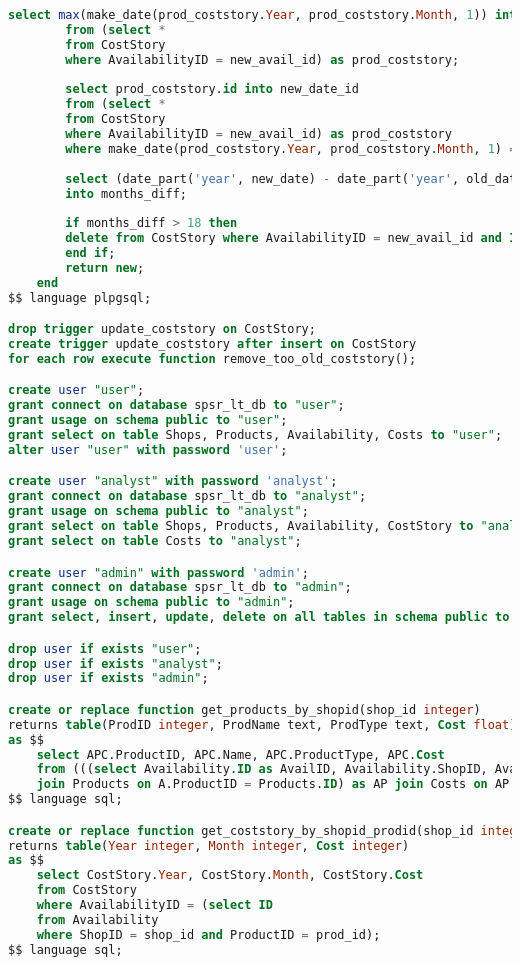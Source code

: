 \documentclass{bmstu}
\begin{document}
\begin{lstlisting}[language=sql, caption={Сценарий создания БД}]
		select max(make_date(prod_coststory.Year, prod_coststory.Month, 1)) into new_date
		from (select * 
		from CostStory 
		where AvailabilityID = new_avail_id) as prod_coststory;
		
		select prod_coststory.id into new_date_id
		from (select * 
		from CostStory 
		where AvailabilityID = new_avail_id) as prod_coststory
		where make_date(prod_coststory.Year, prod_coststory.Month, 1) = new_date;
		
		select (date_part('year', new_date) - date_part('year', old_date)) * 12 + (date_part('month', new_date) - date_part('month', old_date)) + 1
		into months_diff;
		
		if months_diff > 18 then
		delete from CostStory where AvailabilityID = new_avail_id and ID = old_date_id;
		end if;
		return new;
	end
$$ language plpgsql;

drop trigger update_coststory on CostStory;
create trigger update_coststory after insert on CostStory
for each row execute function remove_too_old_coststory();

create user "user";
grant connect on database spsr_lt_db to "user";
grant usage on schema public to "user";
grant select on table Shops, Products, Availability, Costs to "user";
alter user "user" with password 'user';

create user "analyst" with password 'analyst';
grant connect on database spsr_lt_db to "analyst";
grant usage on schema public to "analyst";
grant select on table Shops, Products, Availability, CostStory to "analyst";
grant select on table Costs to "analyst";

create user "admin" with password 'admin';
grant connect on database spsr_lt_db to "admin";
grant usage on schema public to "admin";
grant select, insert, update, delete on all tables in schema public to "admin";

drop user if exists "user";
drop user if exists "analyst";
drop user if exists "admin";

create or replace function get_products_by_shopid(shop_id integer)
returns table(ProdID integer, ProdName text, ProdType text, Cost float)
as $$
	select APC.ProductID, APC.Name, APC.ProductType, APC.Cost
	from (((select Availability.ID as AvailID, Availability.ShopID, Availability.ProductID from Availability where Availability.ShopID = shop_id) as A 
	join Products on A.ProductID = Products.ID) as AP join Costs on AP.AvailID = Costs.AvailabilityID) as APC;
$$ language sql;

create or replace function get_coststory_by_shopid_prodid(shop_id integer, prod_id integer)
returns table(Year integer, Month integer, Cost integer)
as $$
	select CostStory.Year, CostStory.Month, CostStory.Cost
	from CostStory
	where AvailabilityID = (select ID
	from Availability
	where ShopID = shop_id and ProductID = prod_id);
$$ language sql;


\end{lstlisting}
\end{document}
